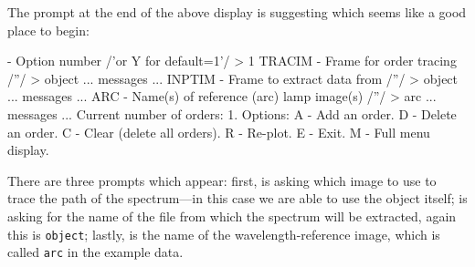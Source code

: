 \documentclass[twoside,11pt]{starlink}
\providecommand{\scspec}[2]{#1}
\begin{document}
The prompt at the end of the above display is suggesting
which seems like a good place to begin:

{
\scspec{\small}{ }
\begin{terminalv}
    - Option number /'or Y for default=1'/ > 1
   TRACIM - Frame for order tracing /''/ > object
    ... messages ...
   INPTIM - Frame to extract data from /''/ > object
    ... messages ...
   ARC - Name(s) of reference (arc) lamp image(s) /''/ > arc
    ... messages ...
    Current number of orders: 1.
    Options:
      A - Add an order.
      D - Delete an order.
      C - Clear (delete all orders).
      R - Re-plot.
      E - Exit.
      M - Full menu display.
\end{terminalv}
}

There are three prompts which appear: first,
 is asking which
image to use to trace the path of the spectrum\scspec{---}{ - }in this case
we are able to use the object itself;
 is asking for the name of
the file from which the spectrum will be extracted, again this is
\verb+object+; lastly,
 is the name of the wavelength-reference
image, which is called \verb+arc+ in the example data.
\end{document}
